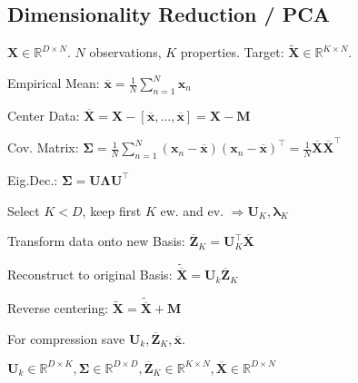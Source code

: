 \documentclass[a4paper, 11pt, landscape]{article}
\begin{document}
\begin{multicols*}{3}
    \section{Dimensionality Reduction / PCA}
    $\mathbf{X} \in \mathbb{R}^{D \times N}$. $N$ observations, $K$ properties. Target: $\tilde{\mathbf{X}} \in \mathbb{R}^{K \times N}$.
    \begin{compactenum}
    \item Empirical Mean: $\overline{\mathbf{x}} = \frac{1}{N} \sum_{n=1}^N \mathbf{x}_n$
    \item Center Data: $\overline{\mathbf{X}} = \mathbf{X} - [\overline{\mathbf{x}}, \ldots, \overline{\mathbf{x}}] = \mathbf{X} - \mathbf{M}$
    \item Cov. Matrix: $\boldsymbol{\Sigma} = \frac{1}{N	} \sum_{n=1}^N (\mathbf{x}_n - \overline{\mathbf{x}}) (\mathbf{x}_n - \overline{\mathbf{x}})^\top = \frac{1}{N} \overline{\mathbf{X}}\overline{\mathbf{X}}^\top$
    \item Eig.Dec.: $\boldsymbol{\Sigma} = \mathbf{U} \boldsymbol{\Lambda} \mathbf{U}^\top$
    \item Select $K < D$, keep first $K$ ew. and ev. $\Rightarrow \mathbf{U}_K, \boldsymbol{\lambda}_K$
    \item Transform data onto new Basis: $\overline{\mathbf{Z}}_K = \mathbf{U}_K^\top \overline{\mathbf{X}}$
    \item Reconstruct to original Basis: $\tilde{\overline{\mathbf{X}}} = \mathbf{U}_k \overline{\mathbf{Z}}_K$
    \item Reverse centering: $\tilde{\mathbf{X}} = \tilde{\overline{\mathbf{X}}} + \mathbf{M}$
    \end{compactenum}

    \begin{compactitem}
    \item For compression save $\mathbf{U}_k, \overline{\mathbf{Z}}_K, \overline{\mathbf{x}}$.
    \item $\mathbf{U}_k \in \mathbb{R}^{D \times K}, \boldsymbol{\Sigma} \in \mathbb{R}^{D \times D}, \overline{\mathbf{Z}}_K \in \mathbb{R}^{K \times N}, \overline{\mathbf{X}} \in \mathbb{R}^{D \times N}$
    \end{compactitem}


\end{multicols*}
\end{document}
